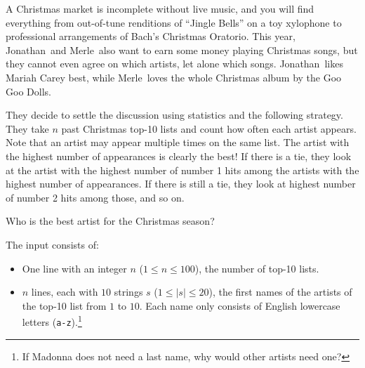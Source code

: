 

\newcommand{\maxn}{100}
\newcommand{\maxlen}{20}

\newcommand{\nameA}{Jonathan}
\newcommand{\nameB}{Merle}

A Christmas market is incomplete without live music, and you will find everything from out-of-tune renditions of ``Jingle Bells'' on a toy xylophone to professional arrangements of Bach's Christmas Oratorio.
This year, \nameA~and \nameB~also want to earn some money playing Christmas songs, but they cannot even agree on which artists, let alone which songs.
\nameA~likes Mariah Carey best, while \nameB~loves the whole Christmas album by the Goo Goo Dolls.

They decide to settle the discussion using statistics and the following strategy.
They take $n$ past Christmas top-10 lists and count how often each artist appears.
Note that an artist may appear multiple times on the same list.
The artist with the highest number of appearances is clearly the best!
If there is a tie, they look at the artist with the highest number of number 1 hits
among the artists with the highest number of appearances.
If there is still a tie, they look at highest number of number 2 hits among those, and so on.

Who is the best artist for the Christmas season?



\begin{Input}
    The input consists of:
    \begin{itemize}
        \item One line with an integer $n$ ($1\leq n \leq \maxn$), the number of top-10 lists.
        \item $n$ lines, each with $10$ strings $s$ ($1 \leq |s| \leq \maxlen$),
    the first names of the artists of the top-10 list from $1$ to $10$. Each
    name only consists of English lowercase letters (\texttt{a-z}).\footnote{If Madonna does not need a last name, why would other artists need one?}
    \end{itemize}
\end{Input}

